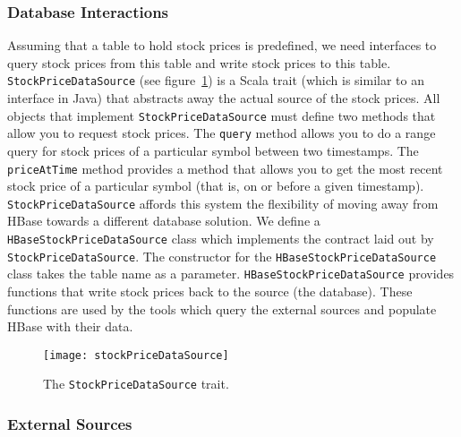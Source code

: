 \subsubsection{Database Interactions}

Assuming that a table to hold stock prices is predefined, we need interfaces to query stock prices from this table and write stock prices to this table.
\texttt{StockPriceDataSource} (see figure~\ref{stockPriceDataSource}) is a Scala trait (which is similar to an interface in Java) that abstracts away the actual source of the stock prices.
All objects that implement \texttt{StockPriceDataSource} must define two methods that allow you to request stock prices.
The \texttt{query} method allows you to do a range query for stock prices of a particular symbol between two timestamps.
The \texttt{priceAtTime} method provides a method that allows you to get the most recent stock price of a particular symbol (that is, on or before a given timestamp).
\texttt{StockPriceDataSource} affords this system the flexibility of moving away from HBase towards a different database solution.
We define a \texttt{HBaseStockPriceDataSource} class which implements the contract laid out by \texttt{StockPriceDataSource}.
The constructor for the \texttt{HBaseStockPriceDataSource} class takes the table name as a parameter.
\texttt{HBaseStockPriceDataSource} provides functions that write stock prices back to the source (the database).
These functions are used by the tools which query the external sources and populate HBase with their data.

\begin{figure}[h]
  \label{stockPriceDataSource}
  \begin{center}
    \texttt{[image: stockPriceDataSource]}
  \end{center}
  \caption{The \texttt{StockPriceDataSource} trait.}
\end{figure}

\subsubsection{External Sources}

